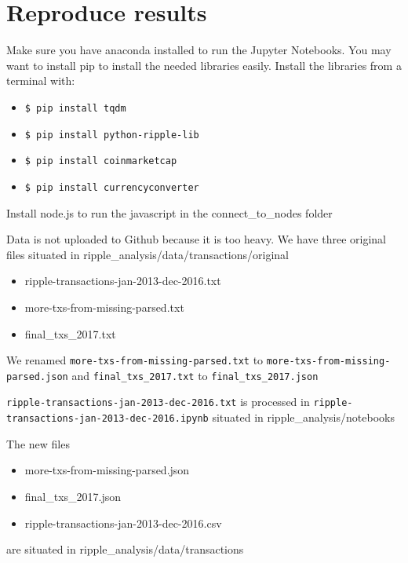 \section{Reproduce results}
Make sure you have anaconda  installed to run the Jupyter Notebooks.
\vspace{\baselineskip}
You may want to install pip  to install the needed libraries easily.
Install the libraries from a terminal with:
\begin{itemize}
\item \texttt{\$ pip install tqdm}
\item \texttt{\$ pip install python-ripple-lib}
\item \texttt{\$ pip install coinmarketcap}
\item \texttt{\$ pip install currencyconverter}
\end{itemize}

Install node.js  to run the javascript in the connect\_to\_nodes folder
\vspace{\baselineskip}

Data is not uploaded to Github because it is too heavy. We have three original files situated in ripple\_analysis/data/transactions/original
\begin{itemize}
\item ripple-transactions-jan-2013-dec-2016.txt
\item more-txs-from-missing-parsed.txt
\item final\_txs\_2017.txt
\end{itemize}

We renamed \texttt{more-txs-from-missing-parsed.txt} to \texttt{more-txs-from-missing-parsed.json} and \texttt{final\_txs\_2017.txt} to \texttt{final\_txs\_2017.json}

\texttt{ripple-transactions-jan-2013-dec-2016.txt} is processed in \texttt{ripple-transactions-jan-2013-dec-2016.ipynb} situated in ripple\_analysis/notebooks
\vspace{\baselineskip}

The new files
\begin{itemize}
\item more-txs-from-missing-parsed.json
\item final\_txs\_2017.json
\item ripple-transactions-jan-2013-dec-2016.csv
\end{itemize}
are situated in ripple\_analysis/data/transactions

